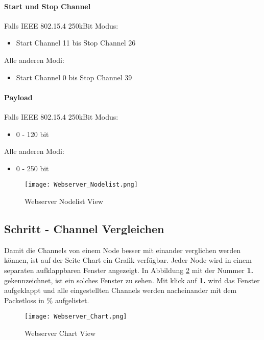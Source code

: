 \paragraph{Start und Stop Channel}
Falls IEEE 802.15.4 250kBit Modus:
\begin{itemize}
	\item Start Channel 11 bis Stop Channel 26
\end{itemize}

Alle anderen Modi:
\begin{itemize}
	\item Start Channel 0 bis Stop Channel 39
\end{itemize}

\paragraph{Payload}
Falls IEEE 802.15.4 250kBit Modus:
\begin{itemize}
	\item 0 - 120 bit
\end{itemize}

Alle anderen Modi:
\begin{itemize}
	\item 0 - 250 bit
\end{itemize}

\begin{figure} [H]
	\centering
	\texttt{[image: Webserver\_Nodelist.png]}
	\caption{Webserver Nodelist View}
	\label{fig:WebserverNodelistView}
\end{figure}

\subsection{Schritt - Channel Vergleichen}\label{sec:SchrittChannelVergleichen}
Damit die Channels von einem Node besser mit einander verglichen werden können, ist auf der Seite Chart ein Grafik verfügbar. Jeder Node wird in einem separaten aufklappbaren Fenster angezeigt. In Abbildung \ref{fig:WebserverChartView} mit der Nummer \textbf{1.} gekennzeichnet, ist ein solches Fenster zu sehen. Mit klick auf \textbf{1.} wird das Fenster aufgeklappt und alle eingestellten Channels werden nacheinander mit dem Packetloss in \% aufgelistet.
\begin{figure} [H]
	\centering
	\texttt{[image: Webserver\_Chart.png]}
	\caption{Webserver Chart View}
	\label{fig:WebserverChartView}
\end{figure}

